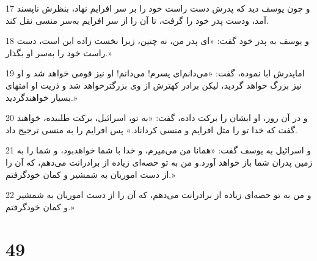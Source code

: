 \par 17 و چون یوسف دید که پدرش دست راست خود را بر سر افرایم نهاد، بنظرش ناپسند آمد، ودست پدر خود را گرفت، تا آن را از سر افرایم به‌سر منسی نقل کند.
\par 18 و یوسف به پدر خود گفت: «ای پدر من، نه چنین، زیرا نخست زاده این است، دست راست خود را به‌سر او بگذار.»
\par 19 اماپدرش ابا نموده، گفت: «می‌دانم‌ای پسرم! می‌دانم! او نیز قومی خواهد شد و او نیز بزرگ خواهد گردید، لیکن برادر کهترش از وی بزرگترخواهد شد و ذریت او امتهای بسیار خواهندگردید.»
\par 20 و در آن روز، او ایشان را برکت داده، گفت: «به تو، اسرائیل، برکت طلبیده، خواهند گفت که خدا تو را مثل افرایم و منسی کرداناد.» پس افرایم را به منسی ترجیح داد. 
\par 21 و اسرائیل به یوسف گفت: «همانا من می‌میرم، و خدا با شما خواهدبود، و شما را به زمین پدران شما باز خواهد آورد.و من به تو حصه‌ای زیاده از برادرانت می‌دهم، که آن را از دست اموریان به شمشیر و کمان خودگرفتم.»
\par 22 و من به تو حصه‌ای زیاده از برادرانت می‌دهم، که آن را از دست اموریان به شمشیر و کمان خودگرفتم.»
 
\chapter{49}

